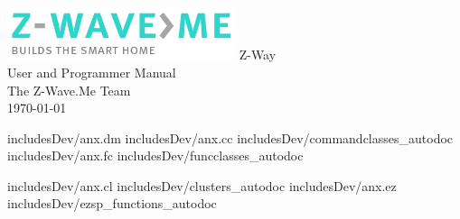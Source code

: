 \documentclass[10pt, pointlessnumbers, twoside=false, normalheadings]{scrbook}
\begin{document}
\begin{titlepage}
\begin{center}
	\includegraphics[width=0.5\textwidth]{pngs/z-wave.me-logo.png}
	\vspace{10mm}
	\Huge{Z-Way}\\
	\vspace{10mm}
	\LARGE{User and Programmer Manual}\\
	\vspace{\fill}	
	\large{The Z-Wave.Me Team}\\
	\large{\today}
\end{center}
\end{titlepage}
		

\newpage{}
\tableofcontents
 
 
 
 
 
 
 







\begin{appendix} 
 {includesDev/anx.dm}
 {includesDev/anx.cc}
 {includesDev/commandclasses_autodoc}
 {includesDev/anx.fc}
 {includesDev/funcclasses_autodoc}
 
 {includesDev/anx.cl}
 {includesDev/clusters_autodoc}
 {includesDev/anx.ez}
 {includesDev/ezsp_functions_autodoc}
\end{appendix} 

\listoftables
\listoffigures
\printindex
\end{document}
